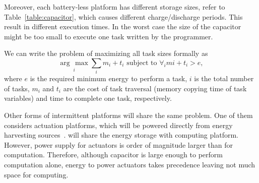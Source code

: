 Moreover, each battery-less platform has different storage sizes, refer to Table~\ref{table:capacitor}, which causes different charge/discharge periods. This result in different execution times. In the worst case the size of the capacitor might be too small to execute one task written by the programmer.

We can write the problem of maximizing all task sizes formally as
%
\begin{equation}
\underset{i}{\arg\,\max} \sum_{i}m_i+t_i \text{~subject to~} \forall_i mi+t_i>e,
\end{equation}
%
where $e$ is the required minimum energy to perform a task, $i$ is the total number of tasks, $m_i$ and $t_i$ are the cost of task traversal (memory copying time of task variables) and time to complete one task, respectively.

Other forms of intermittent platforms will share the same problem. One of them considers actuation platforms, which will be powered directly from energy harvesting sources~\cite{}. will share the energy storage with computing platform. However, power supply for actuators is order of magnitude larger than for computation. Therefore, although capacitor is large enough to perform computation alone, energy to power actuators takes precedence leaving not much space for computing.


